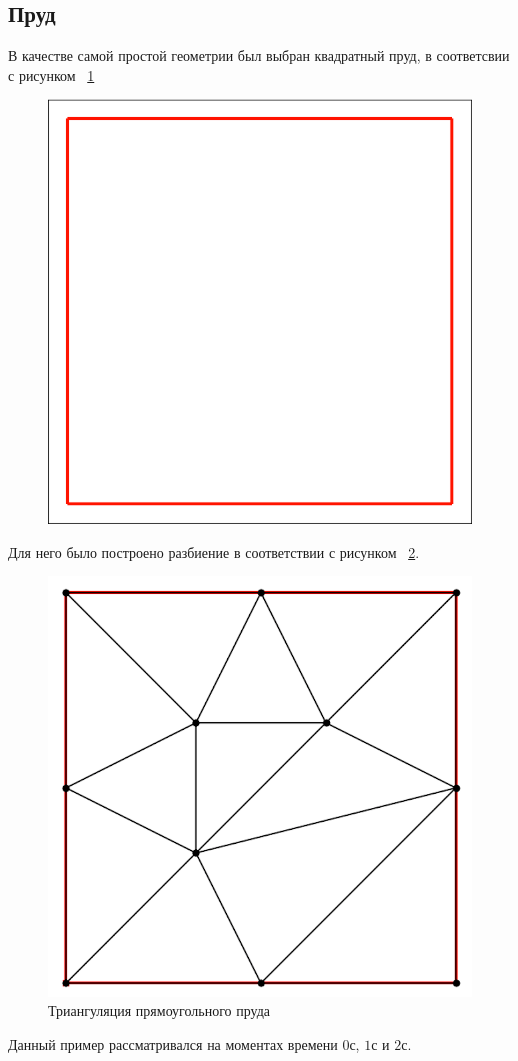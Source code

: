 \documentclass[14pt]{extreport}
\begin{document}
\subsection{Пруд}

В качестве самой простой геометрии был выбран квадратный пруд, в соответсвии с рисунком ~\ref{img:ex1:contour}

\begin{figure}[H]
\centerline{
\includegraphics[width=0.5\linewidth]{images/ex1/contour}}
\caption{}
\label{img:ex1:contour}
\end{figure}

Для него было построено разбиение в соответствии с рисунком ~\ref{img:ex1:mesh}.

\begin{figure}[H]
\centerline{
\includegraphics[width=0.5\linewidth]{images/ex1/mesh}}
\caption{Триангуляция прямоугольного пруда}
\label{img:ex1:mesh}
\end{figure}


Данный пример рассматривался на моментах времени $0$с, $1$с и $2$с.
\end{document}
